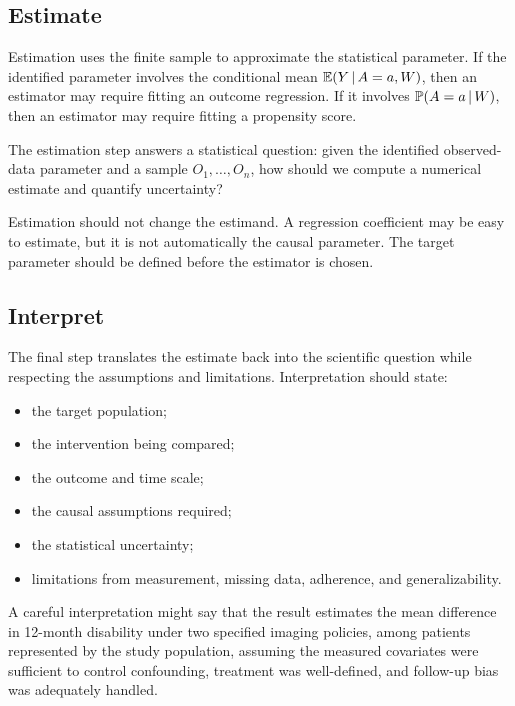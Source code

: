 \subsection{Estimate}

Estimation uses the finite sample to approximate the statistical parameter. If the identified parameter involves the conditional mean $\mathbb{E}(Y\,\vert\, A=a,W)$, then an estimator may require fitting an outcome regression. If it involves $\mathbb{P}(A=a\,\vert\, W)$, then an estimator may require fitting a propensity score.

\begin{estimationbox}
The estimation step answers a statistical question: given the identified observed-data parameter and a sample $O_1,\ldots,O_n$, how should we compute a numerical estimate and quantify uncertainty?
\end{estimationbox}

Estimation should not change the estimand. A regression coefficient may be easy to estimate, but it is not automatically the causal parameter. The target parameter should be defined before the estimator is chosen.

\subsection{Interpret}

The final step translates the estimate back into the scientific question while respecting the assumptions and limitations. Interpretation should state:
\begin{itemize}
  \item the target population;
  \item the intervention being compared;
  \item the outcome and time scale;
  \item the causal assumptions required;
  \item the statistical uncertainty;
  \item limitations from measurement, missing data, adherence, and generalizability.
\end{itemize}

A careful interpretation might say that the result estimates the mean difference in 12-month disability under two specified imaging policies, among patients represented by the study population, assuming the measured covariates were sufficient to control confounding, treatment was well-defined, and follow-up bias was adequately handled.
